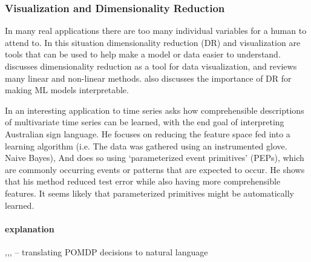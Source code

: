 \subsubsection{Visualization and Dimensionality Reduction}
    In many real applications there are too many individual variables for a human to attend to. In this situation dimensionality reduction (DR) and visualization are tools that can be used to help make a model or data easier to understand. \cite{Venna2007-yj} discusses dimensionality reduction as a tool for data visualization, and reviews many linear and non-linear methods. \citet{Vellido2012-nm} also discusses the importance of DR for making ML models interpretable.

    In an interesting application to time series \citet{Kadous1999-rx} asks how comprehensible descriptions of multivariate time series can be learned, with the end goal of interpreting Australian sign language. He focuses on reducing the feature space fed into a learning algorithm (i.e. The data was gathered using an instrumented glove. Naive Bayes), And does so using `parameterized event primitives' (PEPs), which are commonly occurring events or patterns that are expected to occur. He shows that his method reduced test error while also having more comprehensible features. It seems likely that parameterized primitives might be automatically learned.

%

\paragraph{explanation}
\cite{Swartout1983-ko},\cite{Rouse1986-dz},\cite{Wallace2001-fm}, \cite{Lomas2012-ie} -- translating POMDP decisions to natural language

